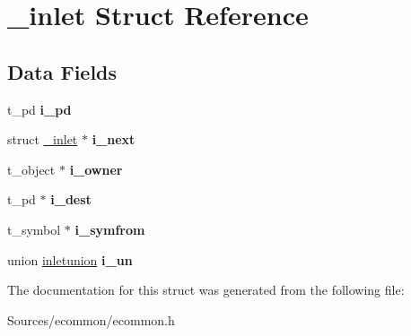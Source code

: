 \hypertarget{struct__inlet}{\section{\-\_\-inlet Struct Reference}
\label{struct__inlet}
}
\subsection*{Data Fields}
\begin{DoxyCompactItemize}
\item 
\hypertarget{struct__inlet_a2639bb3ac2a63922bf7393a675b28fd1}{t\-\_\-pd {\bfseries i\-\_\-pd}}\label{struct__inlet_a2639bb3ac2a63922bf7393a675b28fd1}

\item 
\hypertarget{struct__inlet_adb58549077d98b479e51d877e316ed31}{struct \hyperlink{struct__inlet}{\-\_\-inlet} $\ast$ {\bfseries i\-\_\-next}}\label{struct__inlet_adb58549077d98b479e51d877e316ed31}

\item 
\hypertarget{struct__inlet_aee881cb1182ca7632e843f9eb4503b30}{t\-\_\-object $\ast$ {\bfseries i\-\_\-owner}}\label{struct__inlet_aee881cb1182ca7632e843f9eb4503b30}

\item 
\hypertarget{struct__inlet_a7c16f89d729806fca332d345973b4231}{t\-\_\-pd $\ast$ {\bfseries i\-\_\-dest}}\label{struct__inlet_a7c16f89d729806fca332d345973b4231}

\item 
\hypertarget{struct__inlet_a534c2c39ea2fbb31ea35ce7eb60f8f43}{t\-\_\-symbol $\ast$ {\bfseries i\-\_\-symfrom}}\label{struct__inlet_a534c2c39ea2fbb31ea35ce7eb60f8f43}

\item 
\hypertarget{struct__inlet_a94954961ac07b15480857cece77f7065}{union \hyperlink{unioninletunion}{inletunion} {\bfseries i\-\_\-un}}\label{struct__inlet_a94954961ac07b15480857cece77f7065}

\end{DoxyCompactItemize}


The documentation for this struct was generated from the following file\-:\begin{DoxyCompactItemize}
\item 
Sources/ecommon/ecommon.\-h\end{DoxyCompactItemize}
